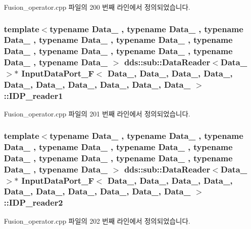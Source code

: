 Fusion\+\_\+operator.\+cpp 파일의 200 번째 라인에서 정의되었습니다.

\subsubsection[{\texorpdfstring{I\+D\+P\+\_\+reader1}{IDP_reader1}}]{\setlength{\rightskip}{0pt plus 5cm}template$<$typename Data\+\_ , typename Data\+\_ , typename Data\+\_ , typename Data\+\_ , typename Data\+\_ , typename Data\+\_ , typename Data\+\_ , typename Data\+\_ , typename Data\+\_ , typename Data\+\_ $>$ dds\+::sub\+::\+Data\+Reader$<$Data\+\_$>$$\ast$ {\bf Input\+Data\+Port\+\_\+F}$<$ Data\+\_, Data\+\_, Data\+\_, Data\+\_, Data\+\_, Data\+\_, Data\+\_, Data\+\_, Data\+\_, Data\+\_ $>$\+::I\+D\+P\+\_\+reader1}\hypertarget{classInputDataPort__F_a79b0bd4a5163911b5fc61610fdd9c0f2}{}\label{classInputDataPort__F_a79b0bd4a5163911b5fc61610fdd9c0f2}


Fusion\+\_\+operator.\+cpp 파일의 201 번째 라인에서 정의되었습니다.

\subsubsection[{\texorpdfstring{I\+D\+P\+\_\+reader2}{IDP_reader2}}]{\setlength{\rightskip}{0pt plus 5cm}template$<$typename Data\+\_ , typename Data\+\_ , typename Data\+\_ , typename Data\+\_ , typename Data\+\_ , typename Data\+\_ , typename Data\+\_ , typename Data\+\_ , typename Data\+\_ , typename Data\+\_ $>$ dds\+::sub\+::\+Data\+Reader$<$Data\+\_$>$$\ast$ {\bf Input\+Data\+Port\+\_\+F}$<$ Data\+\_, Data\+\_, Data\+\_, Data\+\_, Data\+\_, Data\+\_, Data\+\_, Data\+\_, Data\+\_, Data\+\_ $>$\+::I\+D\+P\+\_\+reader2}\hypertarget{classInputDataPort__F_ae81ece0920bedb7e31fe559220a7aa3f}{}\label{classInputDataPort__F_ae81ece0920bedb7e31fe559220a7aa3f}


Fusion\+\_\+operator.\+cpp 파일의 202 번째 라인에서 정의되었습니다.

